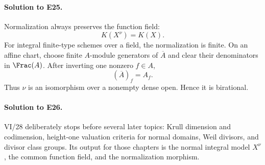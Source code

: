 \paragraph{Solution to E25.}
Normalization always preserves the function field:
\[
K(X^\nu)=K(X).
\]
For integral finite-type schemes over a field, the normalization is finite.  On an affine chart,
choose finite \(A\)-module generators of \(\overline A\) and clear their denominators in
\(\Frac(A)\).  After inverting one nonzero \(f\in A\),
\[
(\overline A)_f=A_f.
\]
Thus \(\nu\) is an isomorphism over a nonempty dense open.  Hence it is birational.

\paragraph{Solution to E26.}
VI/28 deliberately stops before several later topics: Krull dimension and codimension, height-one
valuation criteria for normal domains, Weil divisors, and divisor class groups.  Its output for
those chapters is the normal integral model \(X^\nu\), the common function field, and the
normalization morphism.
